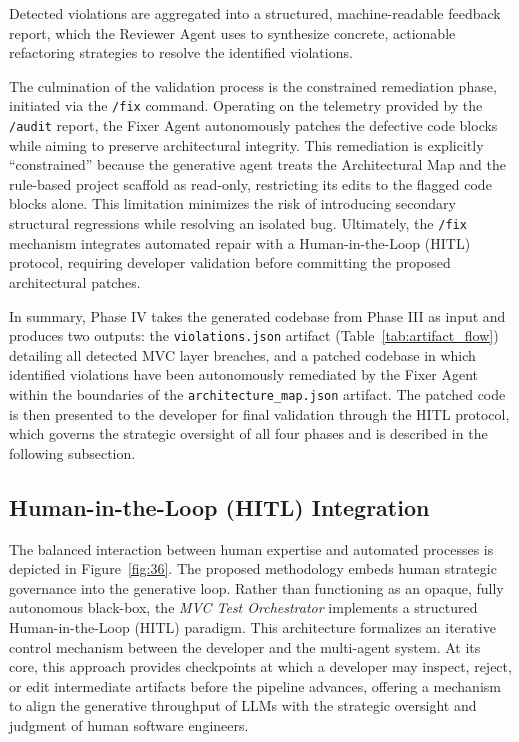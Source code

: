 Detected violations are aggregated into a structured, machine-readable feedback report, which the Reviewer Agent uses to synthesize concrete, actionable refactoring strategies to resolve the identified violations.

The culmination of the validation process is the constrained remediation phase, initiated via the \texttt{/fix} command. Operating on the telemetry provided by the \texttt{/audit} report, the Fixer Agent autonomously patches the defective code blocks while aiming to preserve architectural integrity. This remediation is explicitly ``constrained'' because the generative agent treats the Architectural Map and the rule-based project scaffold as read-only, restricting its edits to the flagged code blocks alone. This limitation minimizes the risk of introducing secondary structural regressions while resolving an isolated bug. Ultimately, the \texttt{/fix} mechanism integrates automated repair with a Human-in-the-Loop (HITL) protocol, requiring developer validation before committing the proposed architectural patches.

In summary, Phase IV takes the generated codebase from Phase III as input and produces two outputs: the \texttt{violations.json} artifact (Table~\ref{tab:artifact_flow}) detailing all detected MVC layer breaches, and a patched codebase in which identified violations have been autonomously remediated by the Fixer Agent within the boundaries of the \texttt{architecture\_map.json} artifact. The patched code is then presented to the developer for final validation through the HITL protocol, which governs the strategic oversight of all four phases and is described in the following subsection.


\subsection{Human-in-the-Loop (HITL) Integration}

The balanced interaction between human expertise and automated processes is depicted in Figure~\ref{fig:36}. The proposed methodology embeds human strategic governance into the generative loop. Rather than functioning as an opaque, fully autonomous black-box, the \textit{MVC Test Orchestrator} implements a structured Human-in-the-Loop (HITL) paradigm. This architecture formalizes an iterative control mechanism between the developer and the multi-agent system. At its core, this approach provides checkpoints at which a developer may inspect, reject, or edit intermediate artifacts before the pipeline advances, offering a mechanism to align the generative throughput of LLMs with the strategic oversight and judgment of human software engineers.

